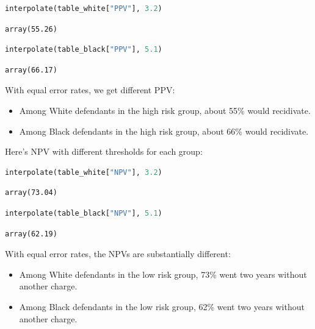 \begin{lstlisting}[language=Python,style=source]
interpolate(table_white["PPV"], 3.2)
\end{lstlisting}

\begin{lstlisting}[style=output]
array(55.26)
\end{lstlisting}

\begin{lstlisting}[language=Python,style=source]
interpolate(table_black["PPV"], 5.1)
\end{lstlisting}

\begin{lstlisting}[style=output]
array(66.17)
\end{lstlisting}

With equal error rates, we get different PPV:

\begin{itemize}
\item
  Among White defendants in the high risk group, about 55\% would
  recidivate.
\item
  Among Black defendants in the high risk group, about 66\% would
  recidivate.
\end{itemize}

Here's NPV with different thresholds for each group:

\begin{lstlisting}[language=Python,style=source]
interpolate(table_white["NPV"], 3.2)
\end{lstlisting}

\begin{lstlisting}[style=output]
array(73.04)
\end{lstlisting}

\begin{lstlisting}[language=Python,style=source]
interpolate(table_black["NPV"], 5.1)
\end{lstlisting}

\begin{lstlisting}[style=output]
array(62.19)
\end{lstlisting}

With equal error rates, the NPVs are substantially different:

\begin{itemize}
\item
  Among White defendants in the low risk group, 73\% went two years
  without another charge.
\item
  Among Black defendants in the low risk group, 62\% went two years
  without another charge.
\end{itemize}

